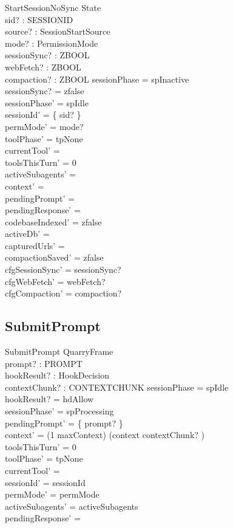 \documentclass[a4paper,10pt,fleqn]{article}
\begin{document}
\begin{schema}{StartSessionNoSync}
  \Delta State \\
  sid? : SESSIONID \\
  source? : SessionStartSource \\
  mode? : PermissionMode \\
  sessionSync? : ZBOOL \\
  webFetch? : ZBOOL \\
  compaction? : ZBOOL
  \where
  sessionPhase = spInactive \\
  sessionSync? = zfalse \\
  sessionPhase' = spIdle \\
  sessionId' = \{ sid? \} \\
  permMode' = mode? \\
  toolPhase' = tpNone \\
  currentTool' = \emptyset \\
  toolsThisTurn' = 0 \\
  activeSubagents' = \emptyset \\
  context' = \langle \rangle \\
  pendingPrompt' = \emptyset \\
  pendingResponse' = \emptyset \\
  codebaseIndexed' = zfalse \\
  activeDb' = \emptyset \\
  capturedUrls' = \emptyset \\
  compactionSaved' = zfalse \\
  cfgSessionSync' = sessionSync? \\
  cfgWebFetch' = webFetch? \\
  cfgCompaction' = compaction?
\end{schema}

\subsection{SubmitPrompt}

\begin{schema}{SubmitPrompt}
  QuarryFrame \\
  prompt? : PROMPT \\
  hookResult? : HookDecision \\
  contextChunk? : CONTEXTCHUNK
  \where
  sessionPhase = spIdle \\
  hookResult? = hdAllow \\
  sessionPhase' = spProcessing \\
  pendingPrompt' = \{ prompt? \} \\
  context' = (1 \upto maxContext) \dres (context \cat \langle contextChunk? \rangle) \\
  toolsThisTurn' = 0 \\
  toolPhase' = tpNone \\
  currentTool' = \emptyset \\
  sessionId' = sessionId \\
  permMode' = permMode \\
  activeSubagents' = activeSubagents \\
  pendingResponse' = \emptyset
\end{schema}
\end{document}

